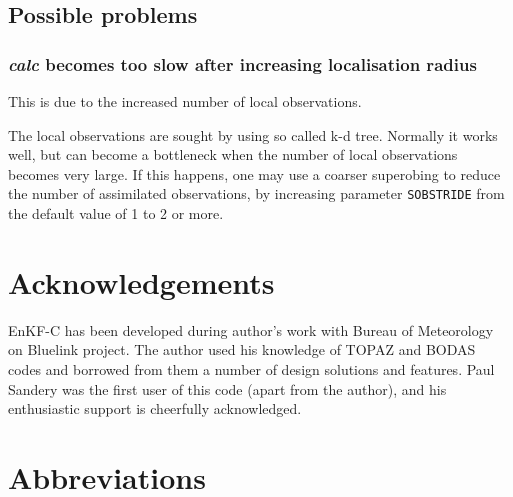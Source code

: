 \documentclass[11pt]{report}
\begin{document}
\section{Possible problems}

\subsection{\emph{calc} becomes too slow after increasing localisation radius}

This is due to the increased number of local observations.

The local observations are sought by using so called k-d tree.
Normally it works well, but can become a bottleneck when the number of local observations becomes very large.
If this happens, one may use a coarser superobing to reduce the number of assimilated observations, by increasing parameter \verb|SOBSTRIDE| from the default value of 1 to 2 or more.

\chapter*{Acknowledgements}

EnKF-C has been developed during author's work with Bureau of Meteorology on Bluelink project.
The author used his knowledge of TOPAZ \citep{sak12b} and BODAS \citep{oke08b} codes and borrowed from them a number of design solutions and features.
Paul Sandery was the first user of this code (apart from the author), and his enthusiastic support is cheerfully acknowledged.

\clearpage

\nocite{eve94a}
\nocite{eve03a}
\nocite{hun04a}
\nocite{hun07a}
\nocite{sak08a}
\nocite{sak10a}
\nocite{sak11a}




\clearpage

\chapter*{Abbreviations}
\end{document}
